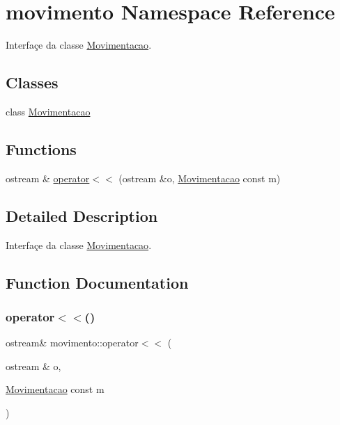 \hypertarget{namespacemovimento}{}\section{movimento Namespace Reference}
\label{namespacemovimento}


Interfaçe da classe \hyperlink{classmovimento_1_1Movimentacao}{Movimentacao}.  


\subsection*{Classes}
\begin{DoxyCompactItemize}
\item 
class \hyperlink{classmovimento_1_1Movimentacao}{Movimentacao}
\end{DoxyCompactItemize}
\subsection*{Functions}
\begin{DoxyCompactItemize}
\item 
ostream \& \hyperlink{namespacemovimento_aeb6b028fe2ad0167ba59b47ceea8a5b5}{operator$<$$<$} (ostream \&o, \hyperlink{classmovimento_1_1Movimentacao}{Movimentacao} const m)
\end{DoxyCompactItemize}


\subsection{Detailed Description}
Interfaçe da classe \hyperlink{classmovimento_1_1Movimentacao}{Movimentacao}. 

\subsection{Function Documentation}
\mbox{\label{namespacemovimento_aeb6b028fe2ad0167ba59b47ceea8a5b5}} 
\subsubsection{\texorpdfstring{operator$<$$<$()}{operator<<()}}
{\footnotesize\ttfamily ostream\& movimento\+::operator$<$$<$ (\begin{DoxyParamCaption}\item[{ostream \&}]{o,  }\item[{\hyperlink{classmovimento_1_1Movimentacao}{Movimentacao} const}]{m }\end{DoxyParamCaption})}


